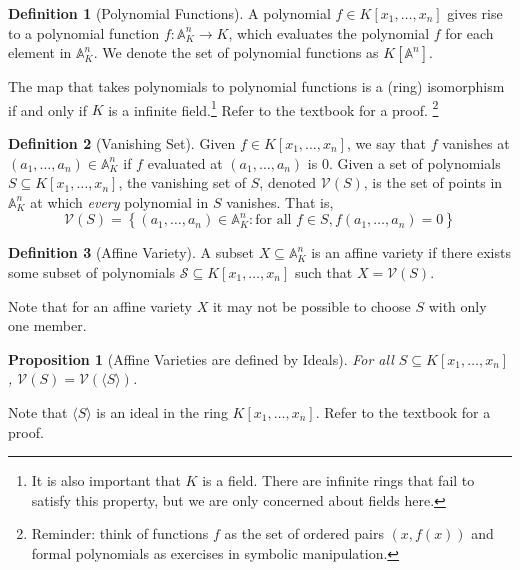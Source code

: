 \documentclass[12pt, a4paper]{article}
\newtheorem{proposition}[theorem]{Proposition}
\theoremstyle{definition}
\newtheorem{definition}{Definition}
\begin{document}
\begin{definition}[Polynomial Functions]
	A polynomial $f \in K[x_1, \dots, x_n]$ gives rise to a polynomial function $f : \mathbb{A}_K^n \rightarrow K$, which evaluates the polynomial $f$ for each element in $\mathbb{A}^n_K$. We denote the set of polynomial functions as $K[\mathbb{A}^n]$.
      \end{definition}
      
      The map that takes polynomials to polynomial functions is a (ring) isomorphism if and only if $K$ is a infinite field.\footnote{It is also important that $K$ is a field. There are infinite rings that fail to satisfy this property, but we are only concerned about fields here.} Refer to the textbook for a proof.
\footnote{Reminder: think of functions $f$ as the set of ordered pairs $(x,f(x))$ and formal polynomials as exercises in symbolic manipulation.}

\begin{definition}[Vanishing Set]
	Given $f \in K[x_1, \dots, x_n]$, we say that $f$ vanishes at $(a_1, \dots, a_n) \in \mathbb{A}^n_K$ if $f$ evaluated at $(a_1, \dots, a_n)$ is $0$. Given a set of polynomials $S \subseteq K[x_1, \dots, x_n]$, the vanishing set of $S$, denoted $\mathcal{V}(S)$, is the set of points in $\mathbb{A}^n_K$ at which \textit{every} polynomial in $S$ vanishes. That is,
	$$\mathcal{V}(S) = \left\{(a_1, \dots, a_n) \in \mathbb{A}^n_K : \text{for all } f \in S, f(a_1, \dots, a_n) = 0\right\}$$
\end{definition}



\begin{definition}[Affine Variety]
	A subset $X \subseteq \mathbb{A}^n_K$ is an affine variety if there exists some subset of polynomials $\mathcal S \subseteq K[x_1, \dots, x_n]$ such that $X = \mathcal{V}(S)$.
\end{definition}
Note that for an affine variety $X$ it may not be possible to choose $S$ with only one member.

\begin{proposition}[Affine Varieties are defined by Ideals]
	For all $S \subseteq K[x_1, \dots, x_n]$, $\mathcal{V}(S) = \mathcal{V}(\langle S \rangle)$.
\end{proposition}
Note that $\langle S \rangle$ is an ideal in the ring $K[x_1, \dots, x_n]$. Refer to the textbook for a proof.
\end{document}
